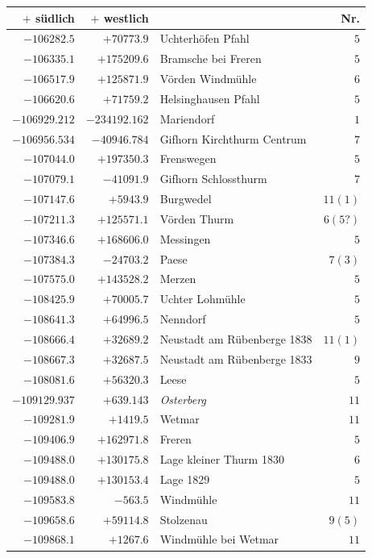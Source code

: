 \begin{center}\begingroup\fontsize{8}{9}\selectfont
\setlength{\tabcolsep}{4pt}
\begin{tabular}{r|r|p{170pt}|r}\hline
\(+\) südlich&\(+\) westlich&&Nr.\\\hline
\(-106282.5\)&\(+70773.9\)&Uchterhöfen Pfahl&\(5\)\\
\(-106335.1\)&\(+175209.6\)&Bramsche bei Freren&\(5\)\\
\(-106517.9\)&\(+125871.9\)&Vörden Windmühle&\(6\)\\
\(-106620.6\)&\(+71759.2\)&Helsinghausen Pfahl&\(5\)\\
\(-106929.212\)&\(-234192.162\)&Mariendorf&\(1\)\\
\(-106956.534\)&\(-40946.784\)&Gifhorn Kirchthurm Centrum&\(7\)\\
\(-107044.0\)&\(+197350.3\)&Frenswegen&\(5\)\\
\(-107079.1\)&\(-41091.9\)&Gifhorn Schlossthurm&\(7\)\\
\(-107147.6\)&\(+5943.9\)&Burgwedel&\(11 (1)\)\\
\(-107211.3\)&\(+125571.1\)&Vörden Thurm&\(6(5?)\)\\
\(-107346.6\)&\(+168606.0\)&Messingen&\(5\)\\
\(-107384.3\)&\(-24703.2\)&Paese&\(7 (3)\)\\
\(-107575.0\)&\(+143528.2\)&Merzen&\(5\)\\
\(-108425.9\)&\(+70005.7\)&Uchter Lohmühle&\(5\)\\
\(-108641.3\)&\(+64996.5\)&Nenndorf&\(5\)\\
\(-108666.4\)&\(+32689.2\)&Neustadt am Rübenberge 1838&\(11 (1)\)\\
\(-108667.3\)&\(+32687.5\)&Neustadt am Rübenberge 1833&\(9\)\\
\(-108081.6\)&\(+56320.3\)&Leese&\(5\)\\
\(-109129.937\)&\(+639.143\)&\textit{Osterberg}&\(11\)\\
\(-109281.9\)&\(+1419.5\)&Wetmar&\(11\)\\
\(-109406.9\)&\(+162971.8\)&Freren&\(5\)\\
\(-109488.0\)&\(+130175.8\)&Lage kleiner Thurm 1830&\(6\)\\
\(-109488.0\)&\(+130153.4\)&Lage 1829&\(5\)\\
\(-109583.8\)&\(-563.5\)&Windmühle&\(11\)\\
\(-109658.6\)&\(+59114.8\)&Stolzenau&\(9 (5)\)\\
\(-109868.1\)&\(+1267.6\)&Windmühle bei Wetmar&\(11\)\\

\end{tabular}
\end{center}
